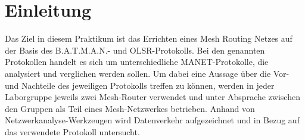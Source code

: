 
\section{Einleitung}

Das Ziel in diesem Praktikum ist das Errichten eines Mesh Routing Netzes auf der Basis des B.A.T.M.A.N.- und OLSR-Protokolls. Bei den genannten Protokollen handelt es sich um unterschiedliche MANET-Protokolle, die analysiert und verglichen werden sollen. Um dabei eine Aussage über die Vor- und Nachteile des jeweiligen Protokolls treffen zu können, werden in jeder Laborgruppe jeweils zwei Mesh-Router verwendet und unter Absprache zwischen den Gruppen als Teil eines Mesh-Netzwerkes betrieben. Anhand von Netzwerkanalyse-Werkzeugen wird Datenverkehr aufgezeichnet und in Bezug auf das verwendete Protokoll untersucht.\\



